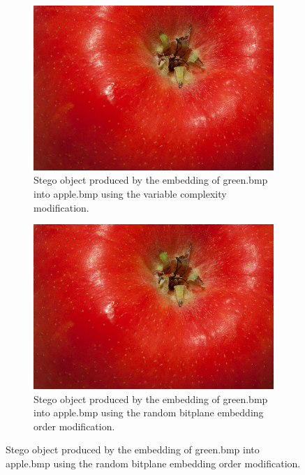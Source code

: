 \documentclass{l4proj}
\begin{document}
\begin{figure}[]
    \centering
    \begin{subfigure}[b]{0.3\textwidth}
        \includegraphics[width=\textwidth]{images/improved_stego_variable_colourincolour.png}
        \caption{Stego object produced by the embedding of green.bmp into apple.bmp using the variable complexity modification.}
        \label{fig:variable_colourincolour}
    \end{subfigure}
    \begin{subfigure}[b]{0.3\textwidth}
        \includegraphics[width=\textwidth]{images/improved_stego_rbeo_colourincolour.png}
        \caption{Stego object produced by the embedding of green.bmp into apple.bmp using the random bitplane embedding order modification.}
        \label{fig:rbeo_colourincolour}
    \end{subfigure}

\end{figure}
\end{document}
